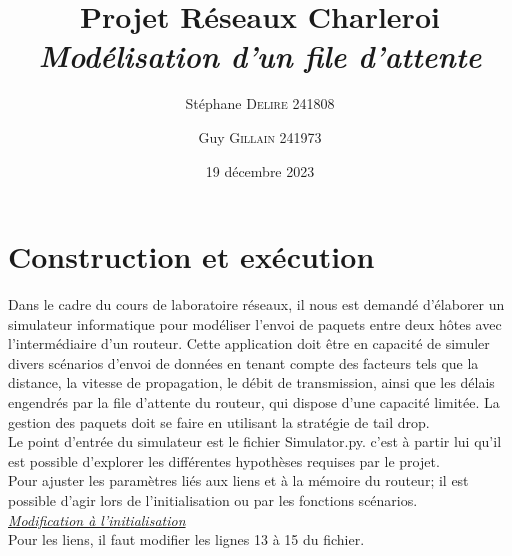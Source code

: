 \documentclass[a4paper, 12pt]{report}
\begin{document}
\title{\textbf{Projet Réseaux Charleroi} \\ \textit{Modélisation d’un file d’attente}}
\author{Stéphane \textsc{Delire} \textsc{241808} \and Guy \textsc{Gillain} \textsc{241973} }


\date{19 décembre 2023}

\maketitle


\renewcommand{\abstractname}{\Large{}\textbf{Abstract}}
 



\clearpage\setcounter{page}{2}

\section*{Construction et exécution}

Dans le cadre du cours de laboratoire réseaux, il nous est demandé d'élaborer un simulateur informatique pour modéliser l'envoi de paquets entre deux hôtes avec l'intermédiaire d'un routeur. 
Cette application doit être en capacité de simuler divers scénarios d’envoi de données en tenant compte des facteurs tels que la distance, la vitesse de propagation, le débit de transmission, ainsi que les délais engendrés par la file d'attente du routeur, qui dispose d'une capacité limitée. La gestion des paquets doit se faire en utilisant la stratégie de tail drop.\\

Le point d'entrée du simulateur est le fichier Simulator.py. c'est à partir lui qu'il est possible d'explorer les différentes hypothèses requises par le projet.\\

Pour ajuster les paramètres liés aux liens et à la mémoire du routeur; il est possible d’agir lors de l’initialisation ou par les fonctions scénarios. \\


\textit{\underline{Modification à l’initialisation}}\\

Pour les liens, il faut modifier les lignes 13 à 15 du fichier.\\
 
\end{document}
